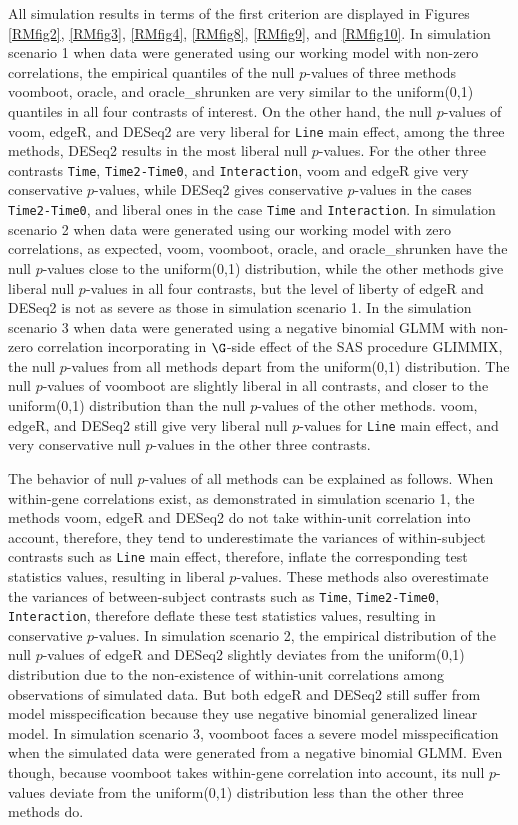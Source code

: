 All simulation results in terms of the first criterion are displayed in  Figures  \ref{RMfig2}, \ref{RMfig3}, \ref{RMfig4}, \ref{RMfig8}, \ref{RMfig9}, and \ref{RMfig10}. In  simulation scenario 1 when data were generated using our working model with non-zero  correlations,  the empirical quantiles of the null $p$-values of three methods voomboot, oracle, and oracle\_shrunken  are  very similar to the uniform(0,1) quantiles in all four contrasts of interest.  On the other hand, the null $p$-values of voom, edgeR, and DESeq2 are very liberal for  \texttt{Line} main effect,  among the three methods,  DESeq2 results in the most liberal null $p$-values. For the other three contrasts \texttt{Time}, \texttt{Time2-Time0}, and  \texttt{Interaction}, voom and  edgeR give very conservative $p$-values, while DESeq2 gives conservative $p$-values in the cases \texttt{Time2-Time0}, and liberal ones in the case \texttt{Time} and \texttt{Interaction}.
In  simulation scenario 2 when  data were generated using our working model with zero  correlations, as expected, voom, voomboot, oracle, and oracle\_shrunken  have  the null $p$-values close to  the uniform(0,1) distribution, while the other methods  give  liberal null $p$-values in all four contrasts, but the level of liberty of edgeR and  DESeq2 is not as severe as those in simulation scenario 1. In the simulation scenario 3 when data were generated using a negative binomial GLMM with non-zero correlation incorporating in $\G$-side effect of the SAS procedure GLIMMIX,  the null $p$-values from  all  methods depart from the uniform(0,1) distribution. The null $p$-values of  voomboot are slightly liberal in all contrasts, and closer to the uniform(0,1) distribution than the null $p$-values of the other methods. voom, edgeR, and DESeq2 still give very liberal null $p$-values for \texttt{Line} main effect, and very conservative null $p$-values in the other three contrasts.

The behavior of null $p$-values of all methods can be explained as follows. When within-gene correlations exist, as demonstrated in  simulation scenario 1, the methods  voom, edgeR and DESeq2  do not take within-unit correlation into account, therefore, they tend to underestimate the variances of within-subject contrasts such as  \texttt{Line} main effect, therefore, inflate the corresponding test statistics values,  resulting in  liberal $p$-values. These methods also overestimate the variances of between-subject contrasts such as  \texttt{Time}, \texttt{Time2-Time0}, \texttt{Interaction}, therefore deflate these  test statistics values, resulting in  conservative $p$-values.  In  simulation scenario 2,  the empirical distribution of the null $p$-values of edgeR and DESeq2 slightly deviates  from the uniform(0,1) distribution due to the non-existence of  within-unit correlations among observations of simulated data. But both edgeR and DESeq2  still suffer from model misspecification because they use negative binomial generalized linear model. In  simulation scenario 3,  voomboot faces a severe model misspecification when the simulated data were generated from a negative binomial GLMM. Even though, because voomboot takes within-gene correlation into account, its null $p$-values deviate from the uniform(0,1) distribution less than the other three methods do.

